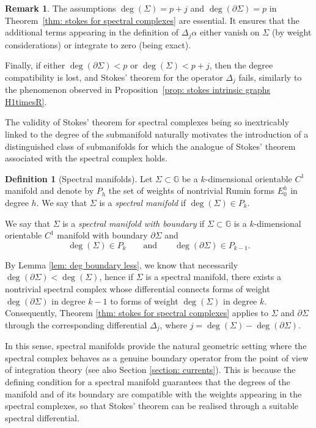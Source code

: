 \documentclass[dvipsnames]{amsart}
\theoremstyle{definition}
\newtheorem{definition}[theorem]{Definition}
\newtheorem{remark}[theorem]{Remark}
\theoremstyle{definition}
\numberwithin{equation}{section}
\begin{document}
\begin{remark}
The assumptions $\deg(\Sigma)=p+j$ and $\deg(\partial\Sigma)=p$ in Theorem~\ref{thm: stokes for spectral complexes} are essential. It ensures that the additional terms appearing in the definition of $\Delta_j\alpha$ either vanish on $\Sigma$ (by weight considerations) or integrate to zero (being exact).


Finally, if either $\deg(\partial\Sigma)<p$ or $\deg(\Sigma)<p+j$, then the degree compatibility is lost, and Stokes' theorem for the operator $\Delta_j$ fails, similarly to the phenomenon observed in Proposition~\ref{prop: stokes intrinsic graphs H1timesR}.

 
\end{remark}


The validity of Stokes' theorem for spectral complexes being so inextricably linked to the degree of the submanifold naturally motivates the introduction of a distinguished class of submanifolds  for which the analogue of Stokes' theorem associated with the spectral complex holds. 
\begin{definition}[Spectral manifolds]\label{def: spectral manifold}
Let $\Sigma\subset\mathbb G$ be a $k$-dimensional orientable $C^1$ manifold and denote by $P_h$ the set of weights of nontrivial Rumin forms $E_0^h$ in degree $h$. We say that $\Sigma$ is a \emph{spectral manifold} if $\deg(\Sigma)\in P_k$.

 We say that $\Sigma$ is a \emph{spectral manifold with boundary} if $\Sigma\subset\mathbb G$ is a $k$-dimensional orientable $C^1$ manifold with boundary $\partial\Sigma$ and
\[
\deg(\Sigma)\in P_k
\qquad\text{and}\qquad
\deg(\partial\Sigma)\in P_{k-1}.
\]

\end{definition}

By Lemma \ref{lem: deg boundary less}, we know that necessarily
$
\deg(\partial\Sigma)<\deg(\Sigma)$, hence if $\Sigma$ is a spectral manifold, there exists a nontrivial spectral complex whose differential connects forms of weight $\deg(\partial\Sigma)$ in degree $k-1$ to forms of weight $\deg(\Sigma)$ in degree $k$. Consequently, Theorem \ref{thm: stokes for spectral complexes} applies to $\Sigma$ and $\partial\Sigma$ through the corresponding differential $\Delta_{j}$, where $j=\operatorname{deg}(\Sigma)-\operatorname{deg}(\partial\Sigma)$.

In this sense, spectral manifolds provide the natural geometric setting where the spectral complex behaves as a genuine boundary operator from the point of view of integration theory (see also Section \ref{section: currents}). This is because the defining condition for a spectral manifold guarantees that the degrees of the manifold and of its boundary are compatible with the weights appearing in the spectral complexes, so that Stokes' theorem can be realised through a suitable spectral differential.
\end{document}
